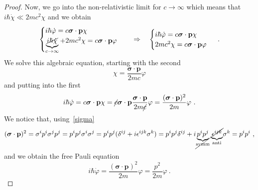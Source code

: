 \begin{proof}
        Now, we go into the non-relativistic limit for $c \rightarrow \infty$ which means that $i \hbar \dot \chi \ll 2 m c^2 \chi$ and we obtain 
        \begin{equation*}
            \begin{cases}
                i \hbar \dot \varphi = c \boldsymbol \sigma \cdot \mathbf p \chi \\
                \underbrace{\cancel{i \hbar \dot \chi}}_{c \rightarrow \infty} + 2m c^2 \chi = c \boldsymbol \sigma \cdot \mathbf p \varphi \\
            \end{cases} \quad \Rightarrow \quad \begin{cases}
                i \hbar \dot \varphi = c \boldsymbol \sigma \cdot \mathbf p \chi \\
                2m c^2 \chi = c \boldsymbol \sigma \cdot \mathbf p \varphi \\
            \end{cases} ~.
        \end{equation*}
        We solve this algebraic equation, starting with the second 
        \begin{equation*}
            \chi = \frac{\boldsymbol \sigma \cdot \mathbf p}{2 m c} \varphi
        \end{equation*}
        and putting into the first
        \begin{equation*}
            i \hbar \dot \varphi = c \boldsymbol \sigma \cdot \mathbf p \chi = \cancel{c} \boldsymbol \sigma \cdot \mathbf p \frac{\boldsymbol \sigma \cdot \mathbf p}{2 m \cancel{c}} \varphi = \frac{(\boldsymbol \sigma \cdot \mathbf p)^2}{2m} \varphi ~.
        \end{equation*}
        We notice that, using~\eqref{sigma}
        \begin{equation*}
            (\boldsymbol \sigma \cdot \mathbf p)^2 = \sigma^i p^i \sigma^j p^j = p^i p^j \sigma^i \sigma^j = p^i p^j (\delta^{ij} + i \epsilon^{ijk} \sigma^k) = p^i p^j \delta^{ij} + i \cancel{\underbrace{p^i p^j}_{\textnormal{symm}}\underbrace{\epsilon^{ijk}}_{\textnormal{anti}}} \sigma^k = p^i p^i ~,
        \end{equation*}
        and we obtain the free Pauli equation 
        \begin{equation*}
            i \hbar \dot \varphi = \frac{(\boldsymbol \sigma \cdot \mathbf p)^2}{2m} \varphi = \frac{p^2}{2m} \varphi ~. 
        \end{equation*}
    \end{proof}

